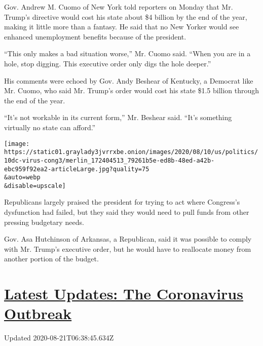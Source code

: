 Gov. Andrew M. Cuomo of New York told reporters on Monday that Mr.
Trump's directive would cost his state about \$4 billion by the end of
the year, making it little more than a fantasy. He said that no New
Yorker would see enhanced unemployment benefits because of the
president.

``This only makes a bad situation worse,'' Mr. Cuomo said. ``When you
are in a hole, stop digging. This executive order only digs the hole
deeper.''

His comments were echoed by Gov. Andy Beshear of Kentucky, a Democrat
like Mr. Cuomo, who said Mr. Trump's order would cost his state \$1.5
billion through the end of the year.

``It's not workable in its current form,'' Mr. Beshear said. ``It's
something virtually no state can afford.''

\texttt{[image: https://static01.graylady3jvrrxbe.onion/images/2020/08/10/us/politics/10dc-virus-cong3/merlin\_172404513\_79261b5e-ed8b-48ed-a42b-ebc959f92ea2-articleLarge.jpg?quality=75\\\&auto=webp\\\&disable=upscale]}

Republicans largely praised the president for trying to act where
Congress's dysfunction had failed, but they said they would need to pull
funds from other pressing budgetary needs.

Gov. Asa Hutchinson of Arkansas, a Republican, said it was possible to
comply with Mr. Trump's executive order, but he would have to reallocate
money from another portion of the budget.

\hypertarget{latest-updates-the-coronavirus-outbreak}{%
\section{\texorpdfstring{\href{https://www.nytimes3xbfgragh.onion/2020/08/20/world/coronavirus-covid.html?action=click\&pgtype=Article\&state=default\&region=MAIN_CONTENT_1\&context=storylines_live_updates}{Latest
Updates: The Coronavirus
Outbreak}}{Latest Updates: The Coronavirus Outbreak}}\label{latest-updates-the-coronavirus-outbreak}}

Updated 2020-08-21T06:38:45.634Z

